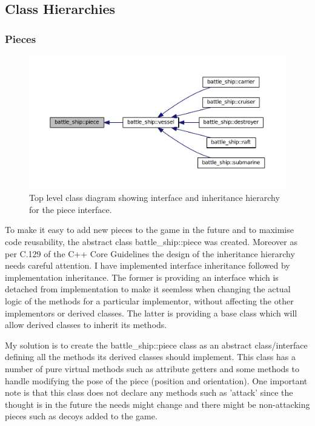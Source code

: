 \documentclass[11pt]{article} %
\begin{document}
\subsection{Class Hierarchies}
\subsubsection{Pieces}
\begin{figure}[H]
\centering
\includegraphics[scale=0.6]{images/piece.pdf}
\caption{Top level class diagram showing interface and inheritance hierarchy for the piece interface.}
\label{fig:piece_class_diagram}
\end{figure}
To make it easy to add new pieces to the game in the future and to maximise code reusability, the abstract class
battle\_ship::piece was created.
Moreover as per C.129 of the C++ Core Guidelines the design of the inheritance hierarchy needs careful attention.
I have implemented interface inheritance followed by implementation inheritance.
The former is providing an interface which is detached from implementation
to make it seemless when changing the actual logic of the methods for a particular implementor, without
affecting the other implementors or derived classes.
The latter is providing a base class which will allow derived classes to inherit its methods.
\\
\par My solution is to create the battle\_ship::piece class as an abstract class/interface defining all the methods its derived classes should implement.
This class has a number of pure virtual methods such as attribute getters and some methods to handle modifying the pose of the piece (position and orientation).
One important note is that this class does not declare any methods such as 'attack' since the thought is
in the future the needs might change and there might be non-attacking pieces such as decoys added to the game.
\end{document}
